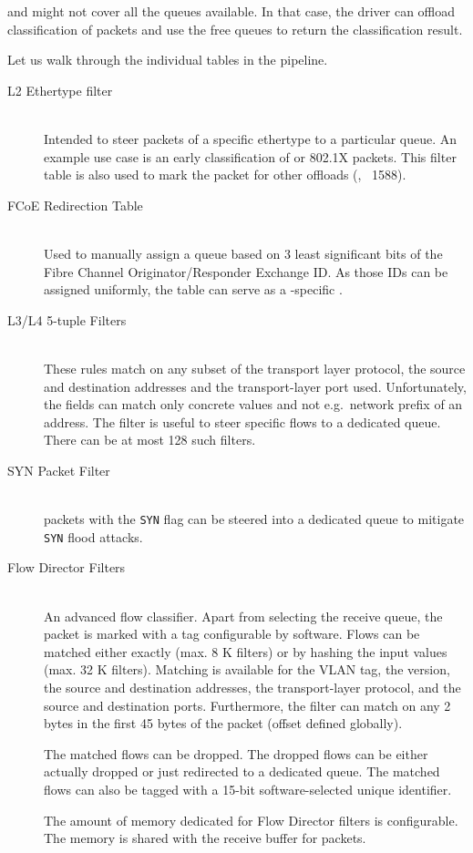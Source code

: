  and  might not cover all the queues available. In that case,
the driver can offload classification of packets and use the free queues to
return the classification result.

Let us walk through the individual tables in the pipeline.
\begin{description}
	\item[L2 Ethertype filter] \hfill \\
		Intended to steer packets of a specific ethertype to
		a particular queue. An example use case is an early classification of
		 or  802.1X packets. This filter table is
		also used to mark the packet for other offloads (, ~1588).
	\item[FCoE Redirection Table] \hfill \\
		Used to manually assign a queue based on 3 least significant bits of
		the Fibre Channel Originator/Responder Exchange ID. As those IDs can be
		assigned uniformly, the table can serve as a -specific .
	\item[L3/L4 5-tuple Filters] \hfill \\
		These rules match on any subset of the transport layer protocol, the source
		and destination  addresses and the transport-layer port used.
		Unfortunately, the fields can match only concrete values and not
		e.g.\ network prefix of an address. The filter is useful to steer specific
		flows to a dedicated queue. There can be at most 128 such filters.
	\item[SYN Packet Filter] \hfill \\
		 packets with the \texttt{SYN} flag can be steered into
		a dedicated queue to mitigate \texttt{SYN} flood attacks.
	\item[Flow Director Filters] \hfill \\
		\label{sec:82599-fdir}%
		An advanced flow classifier. Apart from selecting the receive queue,
		the packet is marked with a tag configurable by software. Flows can be
		matched either exactly (max. 8 K filters) or by hashing the input
		values (max. 32 K filters). Matching is available for the VLAN tag, the
		 version, the source and destination  addresses, the
		transport-layer protocol, and the source and destination ports.
		Furthermore, the filter can
		match on any 2 bytes in the first 45 bytes of the packet (offset
		defined globally).

		The matched flows can be dropped. The dropped flows can be either actually
		dropped or just redirected to a dedicated queue. The matched flows can also
		be tagged with a 15-bit software-selected unique identifier.

		The amount of memory dedicated for Flow Director filters is
		configurable. The memory is shared with the receive buffer for packets.
\end{description}

